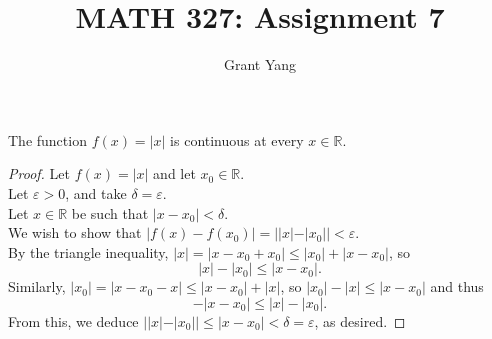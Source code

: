 \documentclass{article}
\newenvironment{theorem}[1]{\renewcommand\theinnercustomthm{#1}\innercustomthm}
  {\endinnercustomthm}
\begin{document}
\title{MATH 327: Assignment 7}
\author{Grant Yang}
\maketitle

\begin{theorem}{1}
    The function $f(x)=|x|$ is continuous at every $x \in \mathbb R$.
\end{theorem}
\begin{proof}
    Let $f(x)=|x|$ and let $x_0 \in \mathbb R$. \\
    Let $\varepsilon>0$, and take $\delta = \varepsilon$. \\
    Let $x\in \mathbb R$ be such that $|x-x_0| < \delta$. \\
    We wish to show that $|f(x)-f(x_0)| = ||x|-|x_0|| < \varepsilon$. \\
    By the triangle inequality, $|x|=|x-x_0 + x_0| \le |x_0| +|x-x_0|$, so \[|x|-|x_0| \le |x-x_0|.\]
    Similarly, $|x_0| = |x-x_0-x| \le |x-x_0| +|x|$, so $|x_0|-|x| \le |x-x_0|$ and thus \[-|x-x_0|\le |x|-|x_0|.\]
    From this, we deduce $||x|-|x_0|| \le |x-x_0| < \delta = \varepsilon$, as desired.
\end{proof}
\end{document}

